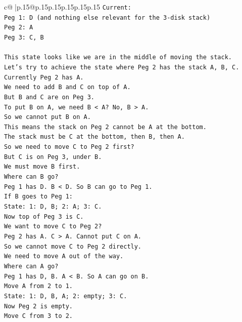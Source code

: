 \documentclass{article}
\begin{document}
{\begin{supertabular}{c@{$\;$}|p{.15\linewidth}@{}p{.15\linewidth}p{.15\linewidth}p{.15\linewidth}p{.15\linewidth}p{.15\linewidth}}
{{{\texttt{Current:} \\
\texttt{Peg 1: D (and nothing else relevant for the 3{-}disk stack)} \\
\texttt{Peg 2: A} \\
\texttt{Peg 3: C, B} \\
\\ 
\texttt{This state looks like we are in the middle of moving the stack.} \\
\texttt{Let's try to achieve the state where Peg 2 has the stack A, B, C.} \\
\texttt{Currently Peg 2 has A.} \\
\texttt{We need to add B and C on top of A.} \\
\texttt{But B and C are on Peg 3.} \\
\texttt{To put B on A, we need B < A? No, B > A.} \\
\texttt{So we cannot put B on A.} \\
\texttt{This means the stack on Peg 2 cannot be A at the bottom.} \\
\texttt{The stack must be C at the bottom, then B, then A.} \\
\texttt{So we need to move C to Peg 2 first?} \\
\texttt{But C is on Peg 3, under B.} \\
\texttt{We must move B first.} \\
\texttt{Where can B go?} \\
\texttt{Peg 1 has D. B < D. So B can go to Peg 1.} \\
\texttt{If B goes to Peg 1:} \\
\texttt{State: 1: D, B; 2: A; 3: C.} \\
\texttt{Now top of Peg 3 is C.} \\
\texttt{We want to move C to Peg 2?} \\
\texttt{Peg 2 has A. C > A. Cannot put C on A.} \\
\texttt{So we cannot move C to Peg 2 directly.} \\
\texttt{We need to move A out of the way.} \\
\texttt{Where can A go?} \\
\texttt{Peg 1 has D, B. A < B. So A can go on B.} \\
\texttt{Move A from 2 to 1.} \\
\texttt{State: 1: D, B, A; 2: empty; 3: C.} \\
\texttt{Now Peg 2 is empty.} \\
\texttt{Move C from 3 to 2.} \\
}}}
\end{supertabular}}
\end{document}
